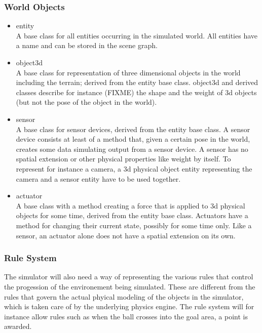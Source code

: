 \documentclass[a4paper,12pt]{article}
\begin{document}
\subsubsection{World Objects}
\label{sec:world_objects}

\begin{itemize}
\item entity\\
  A base class for all entities occurring in the simulated world. All
  entities have a name and can be stored in the scene graph.

\item object3d\\
  A base class for representation of three dimensional objects in the
  world including the terrain; derived from the entity base class. object3d and derived
  classes describe for instance (FIXME) the shape and the weight of 3d
  objects (but not the pose of the object in the world).

\item sensor\\
  A base class for sensor devices, derived from the entity base class.
  A sensor device consists at least of a method that, given a certain
  pose in the world, creates some data simulating output from a sensor
  device. A sensor has no spatial extension or other physical
  properties like weight by itself. To represent for instance a
  camera, a 3d physical object entity representing the camera and a
  sensor entity have to be used together.

\item actuator\\
  A base class with a method creating a force that is applied to 3d
  physical objects for some time, derived from the entity base class.
  Actuators have a method for changing their current state, possibly
  for some time only. Like a sensor, an actuator alone does not have a
  spatial extension on its own.
\end{itemize}



\subsubsection{Rule System}

The simulator will also need a way of representing the various rules that
control the progession of the environement being simulated.  These are
different from the rules that govern the actual phyical modeling of the objects
in the simulator, which is taken care of by the underlying physics engine.
The rule system will for instance allow rules such as when the ball crosses into
the goal area, a point is awarded.
\end{document}
